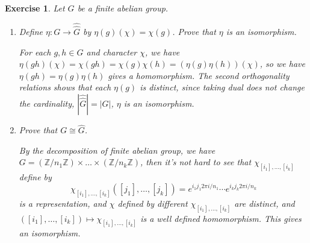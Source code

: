 \documentclass[11pt]{report}
\theoremstyle{mythm}
\let\oldendproof\endproof
\renewenvironment{proof}[1][\proofname]{%
  \oldproof[\normalfont \bfseries #1]%
}{\oldendproof}
\newtheorem{exercise}{Exercise}[chapter]
\renewcommand*{\proofname}{Proof}
\theoremstyle{myans}
\newcommand{\bbZ}{\mathbb Z}
\begin{document}
\begin{exercise}
  Let $G$ be a finite abelian group.
  \begin{enumerate}
    \item Define $\eta \colon G \to \hat{\hat G}$ by $\eta(g)(\chi) = \chi(g)$. Prove that $\eta$ is
    an isomorphism.
    \begin{proof}
      For each $g, h\in G$ and character $\chi$, we have $\eta(gh)(\chi)= \chi(gh) = \chi(g)\chi(h)
      = (\eta(g) \eta(h))(\chi)$, so we have $\eta(gh) = \eta(g)\eta(h)$ gives a homomorphism.
      The second orthogonality relations shows that each $\eta(g)$ is distinct, since taking
      dual does not change the cardinality, $|\hat{\hat G}| = |G|$, $\eta$ is an isomorphism.
    \end{proof}
    \item Prove that $G\cong \hat G$.
    \begin{proof}
      By the decomposition of finite abelian group, we have $G = (\bbZ/n_1\bbZ)\times \dots \times (\bbZ/n_k\bbZ)$,
      then it's not hard to see that $\chi_{[i_1],\dots,[i_k]}$ define by
      \[ \chi_{[i_1],\dots,[i_k]}([j_1],\dots,[j_k])
      = e^{i_1j_1 2\pi i / n_1} \cdots e^{i_kj_k 2\pi i / n_k} \]
      is a representation, and $\chi$ defined by different $\chi_{[i_1],\dots,[i_k]}$
      are distinct, and $([i_1],\dots,[i_k]) \mapsto \chi_{[i_1],\dots,[i_k]}$ is a well defined
      homomorphism. This gives an isomorphism.
    \end{proof}
  \end{enumerate}
\end{exercise}
\end{document}
